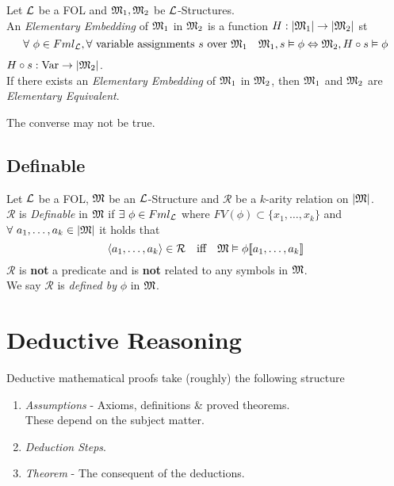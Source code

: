 \documentclass[11pt,a4paper]{article}
\begin{document}

Let $\mathcal{L}$ be a FOL and $\mathfrak{M}_1,\mathfrak{M}_2$ be $\mathcal{L}$-Structures.\\
An \textit{Elementary Embedding} of $\mathfrak{M}_1$ in $\mathfrak{M}_2$ is a function $H:|\mathfrak{M}_1|\to|\mathfrak{M}_2|$ st
$$\forall\ \phi\in Fml_{\mathcal{L}},\forall\ \text{variable assignments }s\text{ over }\mathfrak{M}_1\quad \mathfrak{M}_1,s\vDash\phi\Leftrightarrow\mathfrak{M}_2,H\circ s\vDash\phi$$
\nb $H\circ s:\mathrm{Var}\to|\mathfrak{M}_2|$.\\
\nb If there exists an \textit{Elementary Embedding} of $\mathfrak{M}_1$ in $\mathfrak{M}_2$, then $\mathfrak{M}_1$ and $\mathfrak{M}_2$ are \textit{Elementary Equivalent}.\\


\nb The converse may not be true.

\subsection{Definable}

Let $\mathcal{L}$ be a FOL, $\mathfrak{M}$ be an $\mathcal{L}$-Structure and $\mathcal{R}$ be a $k$-arity relation on $|\mathfrak{M}|$.\\
$\mathcal{R}$ is \textit{Definable} in $\mathfrak{M}$ if $\exists\ \phi\in Fml_{\mathcal{L}}$ where $FV(\phi)\subset\{x_1,\dots,x_k\}$ and $\forall\ a_1,\dots,a_k\in|\mathfrak{M}|$ it holds that
$$\langle a_1,\dots,a_k\rangle\in\mathcal{R}\quad\text{iff}\quad\mathfrak{M}\vDash\phi[\![a_1,\dots,a_k]\!]$$
\nb $\mathcal{R}$ is \textbf{not} a predicate and is \textbf{not} related to any symbols in $\mathfrak{M}$.\\
\nb We say $\mathcal{R}$ is \textit{defined by} $\phi$ in $\mathfrak{M}$.\\


\section{Deductive Reasoning}

Deductive mathematical proofs take (roughly) the following structure
\begin{enumerate}
	\item \textit{Assumptions} - Axioms, definitions \& proved theorems.\\
	\nb These depend on the subject matter.
	\item \textit{Deduction Steps}.
	\item \textit{Theorem} - The consequent of the deductions.
\end{enumerate}
\end{document}
